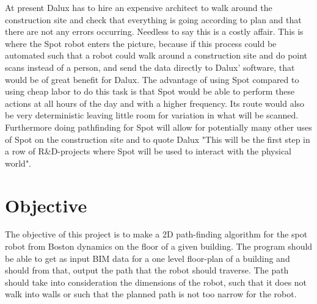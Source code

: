 At present Dalux has to hire an expensive architect to walk around the construction site and check that everything is going according to plan and that there are not any errors occurring. Needless to say this is a costly affair.
This is where the Spot robot enters the picture, because if this process could be automated such that a robot could walk around a construction site and do point scans instead of a person, and send the data directly to Dalux’ software, that would be of great benefit for Dalux. 
The advantage of using Spot compared to using cheap labor to do this task is that Spot would be able to perform these actions at all hours of the day and with a higher frequency. Its route would also be very deterministic leaving little room for variation in what will be scanned.
Furthermore doing pathfinding for Spot will allow for potentially many other uses of Spot on the construction site and to quote Dalux "This will be the first step in a row of R&D-projects where Spot will be used to interact with the physical world".



\section{Objective}\label{Objective} 
The objective of this project is to make a 2D path-finding algorithm for the spot robot from Boston dynamics on the floor of a given building. The program should be able to get as input BIM data for a one level floor-plan of a building and should from that, output the path that the robot should traverse. The path should take into consideration the dimensions of the robot, such that it does not walk into walls or such that the planned path is not too narrow for the robot.

